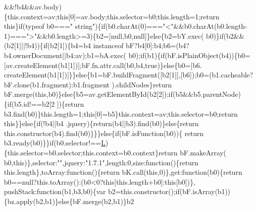\begin{DoxyCode}
      &&!b4&&av.body)\{this.context=av;\textcolor{keyword}{this}[0]=av.body;this.selector=b0;this.length=1;\textcolor{keywordflow}{return} \textcolor{keyword}{this}\}\textcolor{keywordflow}{if}(typeof b0===\textcolor{stringliteral}{"
      string"})\{\textcolor{keywordflow}{if}(b0.charAt(0)===\textcolor{stringliteral}{"<"}&&b0.charAt(b0.length-1)===\textcolor{stringliteral}{">"}&&b0.length>=3)\{b2=[null,b0,null]\}\textcolor{keywordflow}{else}\{b2=bY.exec(
      b0)\}\textcolor{keywordflow}{if}(b2&&(b2[1]||!b4))\{\textcolor{keywordflow}{if}(b2[1])\{b4=b4 instanceof bF?b4[0]:b4;b6=(b4?b4.ownerDocument||b4:av);b1=bA.exec(
      b0);\textcolor{keywordflow}{if}(b1)\{\textcolor{keywordflow}{if}(bF.isPlainObject(b4))\{b0=[av.createElement(b1[1])];bF.fn.attr.call(b0,b4,\textcolor{keyword}{true})\}\textcolor{keywordflow}{else}\{b0=[b6.
      createElement(b1[1])]\}\}\textcolor{keywordflow}{else}\{b1=bF.buildFragment([b2[1]],[b6]);b0=(b1.cacheable?bF.clone(b1.fragment):b1.fragment
      ).childNodes\}\textcolor{keywordflow}{return} bF.merge(\textcolor{keyword}{this},b0)\}\textcolor{keywordflow}{else}\{b5=av.getElementById(b2[2]);\textcolor{keywordflow}{if}(b5&&b5.parentNode)\{\textcolor{keywordflow}{if}(b5.id!==b2[2
      ])\{\textcolor{keywordflow}{return} b3.find(b0)\}this.length=1;\textcolor{keyword}{this}[0]=b5\}this.context=av;this.selector=b0;\textcolor{keywordflow}{return} \textcolor{keyword}{this}\}\}\textcolor{keywordflow}{else}\{\textcolor{keywordflow}{if}(!b4||b4
      .jquery)\{\textcolor{keywordflow}{return}(b4||b3).find(b0)\}\textcolor{keywordflow}{else}\{\textcolor{keywordflow}{return} this.constructor(b4).find(b0)\}\}\}\textcolor{keywordflow}{else}\{\textcolor{keywordflow}{if}(bF.isFunction(b0))\{\textcolor{keywordflow}{
      return} b3.ready(b0)\}\}\textcolor{keywordflow}{if}(b0.selector!==\hyperlink{docs_2_programmer's_manual_2html_2jquery_8js_a38ee4c0b5f4fe2a18d0c783af540d253}{L})\{this.selector=b0.selector;this.context=b0.context\}\textcolor{keywordflow}{return} bF.makeArray(
      b0,\textcolor{keyword}{this})\},selector:\textcolor{stringliteral}{""},jquery:\textcolor{stringliteral}{"1.7.1"},length:0,size:\textcolor{keyword}{function}()\{\textcolor{keywordflow}{return} this.length\},toArray:\textcolor{keyword}{function}()\{\textcolor{keywordflow}{return} 
      bK.call(\textcolor{keyword}{this},0)\},\textcolor{keyword}{get}:\textcolor{keyword}{function}(b0)\{\textcolor{keywordflow}{return} b0==null?this.toArray():(b0<0?this[this.length+b0]:this[b0])\},
      pushStack:function(b1,b3,b0)\{var b2=this.constructor();\textcolor{keywordflow}{if}(bF.isArray(b1))\{bz.apply(b2,b1)\}\textcolor{keywordflow}{else}\{bF.merge(b2,b1)\}b2

\end{DoxyCode}
